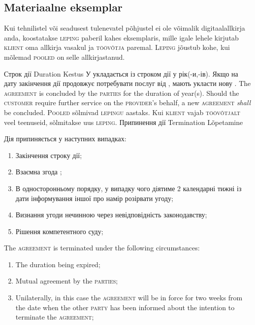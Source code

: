 \begin{Form}
\begin{paracol}{3}
{        \subsection{Materiaalne eksemplar}
        Kui tehnilistel või seadusest tulenevatel põhjustel ei ole võimalik digitaalallkirja anda, koostatakse \textsc{leping} paberil kahes eksemplaris, mille igale lehele kirjutab \textsc{klient} oma allkirja vasakul ja \textsc{töövõtja} paremal. L\textsc{eping} jõustub kohe, kui mõlemad \textsc{pooled} on selle allkirjastanud.
        }
      \clause
        {Строк дії}
        {Duration}
        {Kestus}
        {У укладається  із строком дії у  рік(-и,-ів). Якщо  на дату закінчення дії  продовжує потребувати послуг від ,  мають укласти нову .}
        {The \textsc{agreement} is concluded by the \textsc{parties} for the duration of  year(s). Should the \textsc{customer} require further service on the \textsc{provider}'s behalf, a new \textsc{agreement} \emph{shall} be concluded.}
        {P\textsc{ooled} sõlmivad \textsc{lepingu}  aastaks. Kui \textsc{klient} vajab \textsc{töövõtjalt} veel teenuseid, sõlmitakse uus \textsc{leping}.}
      \clause
        {Припинення дії}
        {Termination}
        {Lõpetamine}
        {Дія  припиняється у наступних випадках:
        \begin{enumerate}
          \item Закінчення строку дії;
          \item Взаємна згода ;
          \item В односторонньому порядку, у випадку чого  діятиме 2 календарні тижні із дати інформування іншої  про намір розірвати угоду; 
          \item Визнання угоди нечинною через невідповідність законодавству;
          \item Рішення компетентного суду;
        \end{enumerate}}
        {The \textsc{agreement} is terminated under the following circumstances:
        \begin{enumerate}
          \item The duration being expired;
          \item Mutual agreement by the \textsc{parties};
          \item Unilaterally, in this case the \textsc{agreement} will be in force for two weeks from the date when the other \textsc{party} has been informed about the intention to terminate the \textsc{agreement};

\end{enumerate}}
\end{paracol}
\end{Form}
